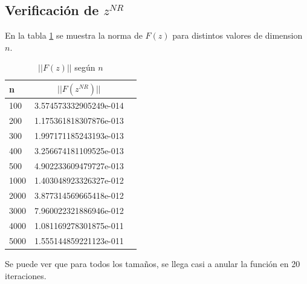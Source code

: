 \documentclass{endm}
\begin{document}
\subsection{Verificación de $z^{NR}$}
En la tabla \ref{tab:table_5_2} se muestra la norma de $F(z)$ para distintos valores de dimension $n$.
\begin{table}[h!]
    \begin{center}
      \caption{$||F(z)||$ según $n$}
      \label{tab:table_5_2}
      \begin{tabular}{l|c|r} %
        \textbf{n} & \textbf{$||F(z^{NR})||$}\\
        \hline
         100 & 3.574573332905249e-014\\
         200 & 1.175361818307876e-013\\
         300 & 1.997171185243193e-013\\
         400 & 3.256674181109525e-013\\
         500 & 4.902233609479727e-013\\
        1000 & 1.403048923326327e-012\\
        2000 & 3.877314569665418e-012\\
        3000 & 7.960022321886946e-012\\
        4000 & 1.081169278301875e-011\\
        5000 & 1.555144859221123e-011\\
        \hline
      \end{tabular}
    \end{center}
  \end{table}  
Se puede ver que para todos los tamaños, se llega casi a anular la función en 20 iteraciones.

\end{document}

